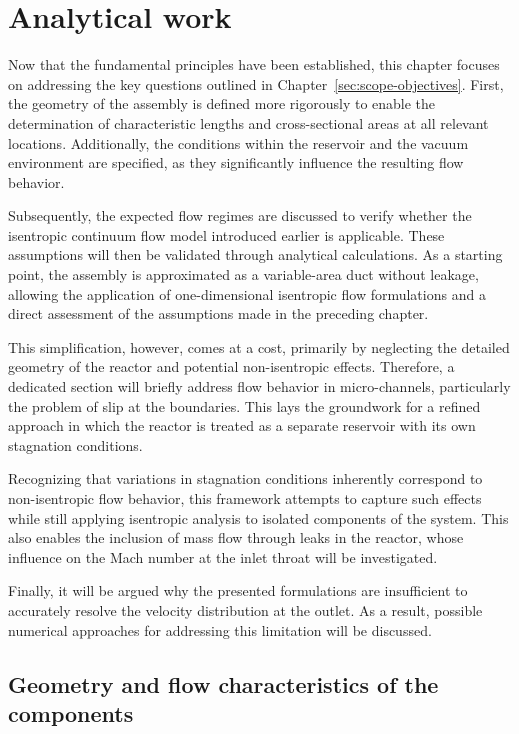 
\section{Analytical work}
	Now that the fundamental principles have been established, this chapter focuses on addressing the key questions outlined in Chapter~\ref{sec:scope-objectives}.
	First, the geometry of the assembly is defined more rigorously to enable the determination of characteristic lengths and cross-sectional areas at all relevant locations.
	Additionally, the conditions within the reservoir and the vacuum environment are specified, as they significantly influence the resulting flow behavior.

	Subsequently, the expected flow regimes are discussed to verify whether the isentropic continuum flow model introduced earlier is applicable.
	These assumptions will then be validated through analytical calculations.
	As a starting point, the assembly is approximated as a variable-area duct without leakage, allowing the application of one-dimensional isentropic flow formulations and a direct assessment of the assumptions made in the preceding chapter.

	This simplification, however, comes at a cost, primarily by neglecting the detailed geometry of the reactor and potential non-isentropic effects.
	Therefore, a dedicated section will briefly address flow behavior in micro-channels, particularly the problem of slip at the boundaries.
	This lays the groundwork for a refined approach in which the reactor is treated as a separate reservoir with its own stagnation conditions.

	Recognizing that variations in stagnation conditions inherently correspond to non-isentropic flow behavior, this framework attempts to capture such effects while still applying isentropic analysis to isolated components of the system.
	This also enables the inclusion of mass flow through leaks in the reactor, whose influence on the Mach number at the inlet throat will be investigated.

	Finally, it will be argued why the presented formulations are insufficient to accurately resolve the velocity distribution at the outlet.
	As a result, possible numerical approaches for addressing this limitation will be discussed.

\subsection{Geometry and flow characteristics of the components}\label{sec:geometry}
	

